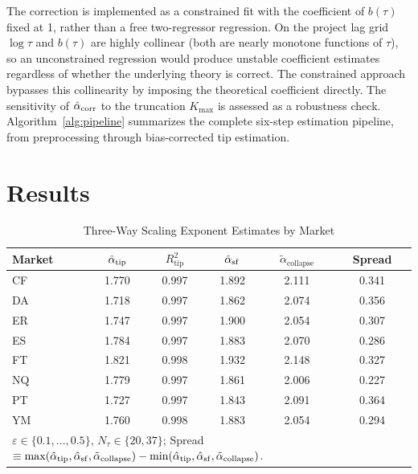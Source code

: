 \documentclass[conference]{IEEEtran}
\begin{document}
The correction is implemented as a constrained fit with the coefficient of
$b(\tau)$ fixed at 1, rather than a free two-regressor regression. On the
project lag grid $\log\tau$ and $b(\tau)$ are highly collinear (both are
nearly monotone functions of $\tau$), so an unconstrained regression would
produce unstable coefficient estimates regardless of whether the underlying
theory is correct. The constrained approach bypasses this collinearity by
imposing the theoretical coefficient directly. The sensitivity of
$\hat{\alpha}_{\mathrm{corr}}$ to the truncation $K_{\max}$ is assessed as a
robustness check.
Algorithm~\ref{alg:pipeline} summarizes the complete six-step estimation
pipeline, from preprocessing through bias-corrected tip estimation.

\section{Results}
\label{sec:results}

\begin{table}[!t]
\begin{center}
\caption{Three-Way Scaling Exponent Estimates by Market}
\begin{tabular}{lccccc}
\hline
Market & $\hat{\alpha}_{\mathrm{tip}}$ & $R^2_{\mathrm{tip}}$
       & $\hat{\alpha}_{\mathrm{sf}}$ & $\tilde{\alpha}_{\mathrm{collapse}}$ & Spread \\
\hline
CF & 1.770 & 0.997 & 1.892 & 2.111 & 0.341 \\
DA & 1.718 & 0.997 & 1.862 & 2.074 & 0.356 \\
ER & 1.747 & 0.997 & 1.900 & 2.054 & 0.307 \\
ES & 1.784 & 0.997 & 1.883 & 2.070 & 0.286 \\
FT & 1.821 & 0.998 & 1.932 & 2.148 & 0.327 \\
NQ & 1.779 & 0.997 & 1.861 & 2.006 & 0.227 \\
PT & 1.727 & 0.997 & 1.843 & 2.091 & 0.364 \\
YM & 1.760 & 0.998 & 1.883 & 2.054 & 0.294 \\
\hline
\multicolumn{6}{l}{$\varepsilon\in\{0.1,\ldots,0.5\}$, $N_\tau\in\{20,37\}$;
  Spread $\equiv \max(\hat{\alpha}_{\mathrm{tip}},\hat{\alpha}_{\mathrm{sf}},\tilde{\alpha}_{\mathrm{collapse}})
  - \min(\hat{\alpha}_{\mathrm{tip}},\hat{\alpha}_{\mathrm{sf}},\tilde{\alpha}_{\mathrm{collapse}})$.}
\end{tabular}
\label{tab:three_way}
\end{center}
\end{table}
\end{document}
